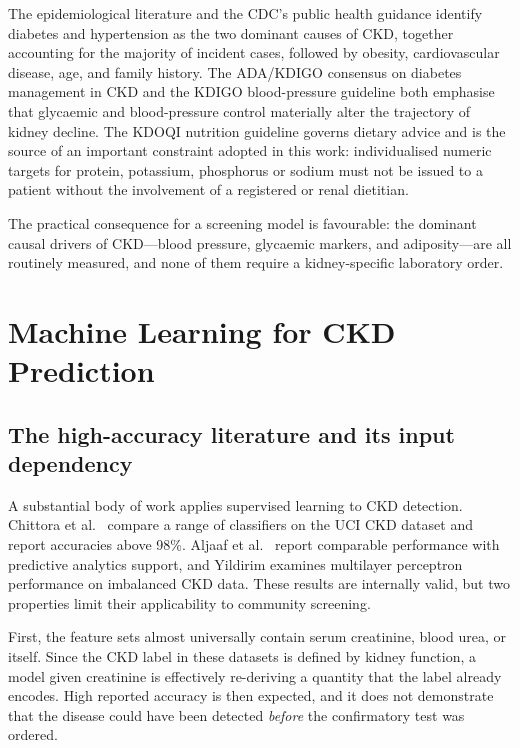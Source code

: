 The epidemiological literature and the CDC's public health guidance
\cite{cdcbasics,cdcprevent,cdcrisk} identify diabetes and hypertension as the
two dominant causes of CKD, together accounting for the majority of incident
cases, followed by obesity, cardiovascular disease, age, and family history.
The ADA/KDIGO consensus on diabetes management in CKD \cite{adakdigo2022} and
the KDIGO blood-pressure guideline \cite{kdigo2021bp} both emphasise that
glycaemic and blood-pressure control materially alter the trajectory of kidney
decline. The KDOQI nutrition guideline \cite{kdoqi2020} governs dietary advice
and is the source of an important constraint adopted in this work: individualised
numeric targets for protein, potassium, phosphorus or sodium must not be issued
to a patient without the involvement of a registered or renal dietitian.

The practical consequence for a screening model is favourable: the dominant
causal drivers of CKD---blood pressure, glycaemic markers, and adiposity---are
all routinely measured, and none of them require a kidney-specific laboratory
order.

\section{Machine Learning for CKD Prediction}
\label{sec:ml_ckd}

\subsection{The high-accuracy literature and its input dependency}

A substantial body of work applies supervised learning to CKD detection.
Chittora et al.\ \cite{chittora2021} compare a range of classifiers on the UCI
CKD dataset and report accuracies above 98\%. Aljaaf et al.\ \cite{aljaaf2019}
report comparable performance with predictive analytics support, and Yildirim
\cite{yildirim2017} examines multilayer perceptron performance on imbalanced
CKD data. These results are internally valid, but two properties limit their
applicability to community screening.

First, the feature sets almost universally contain serum creatinine, blood urea,
or \eGFR{} itself. Since the CKD label in these datasets is defined by kidney
function, a model given creatinine is effectively re-deriving a quantity that
the label already encodes. High reported accuracy is then expected, and it does
not demonstrate that the disease could have been detected \emph{before} the
confirmatory test was ordered.

